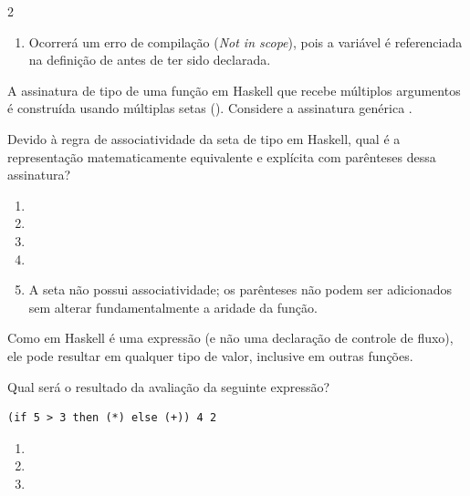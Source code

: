 \documentclass[a4paper,10pt,brazil]{article}
\begin{document}
\begin{multicols}{2}
\begin{enumerate}
  \item Ocorrerá um erro de compilação (\emph{Not in scope}), pois a variável  é referenciada na definição de  antes de ter sido declarada.


\end{enumerate}

A assinatura de tipo de uma função em Haskell que recebe múltiplos argumentos é construída usando múltiplas setas (\haskellinline{->}). Considere a assinatura genérica . 

Devido à regra de associatividade da seta de tipo em Haskell, qual é a representação matematicamente equivalente e explícita com parênteses dessa assinatura?

\begin{enumerate}
  \item {}

  \item {}

  \item {}

  \item {}

  \item A seta não possui associatividade; os parênteses não podem ser adicionados sem alterar fundamentalmente a aridade da função.


\end{enumerate}

Como  em Haskell é uma expressão (e não uma declaração de controle de fluxo), ele pode resultar em qualquer tipo de valor, inclusive em outras funções. 

Qual será o resultado da avaliação da seguinte expressão?
\begin{verbatim}
(if 5 > 3 then (*) else (+)) 4 2
\end{verbatim}

\begin{enumerate}
  \item {}

  \item {}

  \item {}


\end{enumerate}
\end{multicols}
\end{document}
